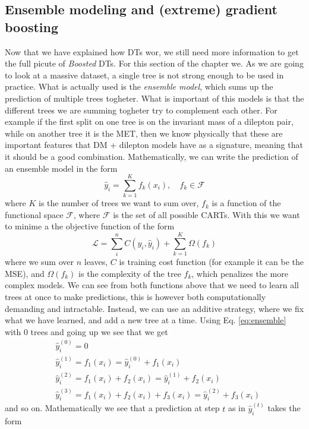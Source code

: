 \documentclass[12pt, a4paper]{book}
\begin{document}
\subsection{Ensemble modeling and (extreme) gradient boosting}
Now that we have explained how DTs wor, we still need more information to get the full picute of \textit{Boosted} DTs. For this section of the chapter we. As we are going to look at a massive dataset, a single tree is not strong enough to be used in practice. What is actually used is the \textit{ensemble model}, which 
sums up the prediction of multiple trees togheter. What is important of this models is that the different trees we are summing togheter try to complement each other. For example if the first split on one tree is on the invariant mass of a dilepton pair, while on another tree it is the MET, 
then we know physically that these are important features that DM + dilepton models have as a signature, meaning that it should be a good combination. Mathematically, we can write the prediction of an ensemble model in the form
\begin{equation}\label{eq:ensemble}
    \hat{y}_i =\sum_{k=1}^{K}f_k(x_i),\quad f_k\in\mathcal{F}
\end{equation}
where $K$ is the number of trees we want to sum over, $f_k$ is a function of the functional space $\mathcal{F}$, where $\mathcal{F}$ is the set of all possible CARTs. With this we want to minime a the objective function of the form
$$
    \mathcal{L} = \sum_{i}^{n}C(y_i,\hat{y}_i)+\sum_{k=1}^{K}\Omega(f_k)
$$
where we sum over $n$ leaves, $C$ is training cost function (for example it can be the MSE), and $\Omega(f_k)$ is the complexity of the tree $f_k$, which penalizes the more complex models. We can see from both functions above that we need to learn all trees at once to make predictions, this is however both 
computationally demanding and intractable. Instead, we can use an additive strategy, where we fix what we have learned, and add a new tree at a time. Using Eq. \ref{eq:ensemble} with 0 trees and going up we see that we get
\begin{align*}
    &\hat{y}_i^{(0)} = 0\\
    &\hat{y}_i^{(1)} = f_1(x_i)=\hat{y}_i^{(0)}+f_1(x_i)\\
    &\hat{y}_i^{(2)} = f_1(x_i)+f_2(x_i)=\hat{y}_i^{(1)}+f_2(x_i)\\
    &\hat{y}_i^{(3)} = f_1(x_i)+f_2(x_i)+f_3(x_i)=\hat{y}_i^{(2)}+f_3(x_i)
\end{align*}
and so on. Mathematically we see that a prediction at step $t$ as in $\hat{y}_i^{(t)}$ takes the form
\end{document}
